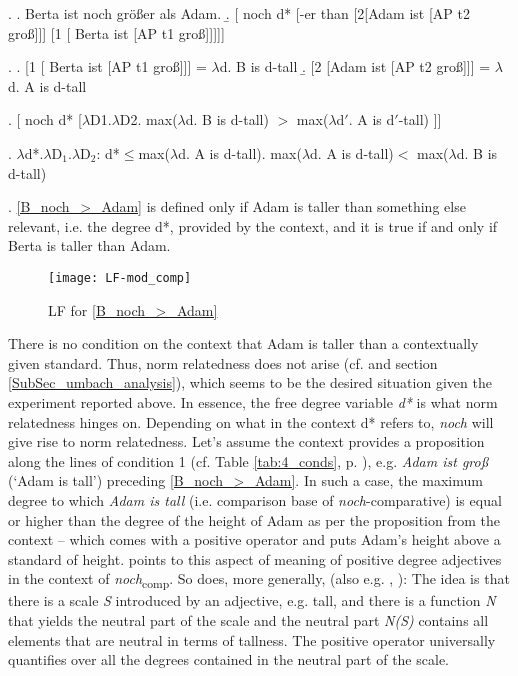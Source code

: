 \documentclass[output=paper,
modfonts
]{langscibook}
\begin{document}
\ex. \a. Berta ist noch größer als Adam. \label{B_noch_>_Adam}
\b. [ noch d* [-er than [2[Adam ist [AP t2 groß]]] [1 [ Berta ist [AP t1 groß]]]]] \label{LF_B_noch_>_Adam}

\ex. \label{PA_on_clauses} \a. [1 [ Berta ist [AP t1 groß]]] = $\lambda$d. B is d-tall
\b. [2 [Adam ist [AP t2 groß]]] =  $\lambda$d. A is d-tall

\ex. [ noch d* [$\lambda$D1.$\lambda$D2. max($\lambda$d. B is d-tall) $>$ max($\lambda$d$'$. A is d$'$-tall) ]] \label{calc_plugin}

\ex. $\lambda$d*.$\lambda$D$_1$.$\lambda$D$_2$: d*$\leq$max($\lambda$d. A is d-tall). max($\lambda$d. A is d-tall)$<$ max($\lambda$d. B is d-tall)  \label{output_calc}

\ex. \ref{B_noch_>_Adam} is defined only if Adam is taller than something else relevant, i.e. the degree d*, provided by the context, and it is true if and only if Berta is taller than Adam.

\begin{figure}[H]
\texttt{[image: LF-mod\_comp]}
\caption{LF for \ref{B_noch_>_Adam}}
\label{fig:LF_B_noch_>_Adam}
\end{figure}

\noindent There is no condition on the context that Adam is taller than a contextually given standard. Thus, norm relatedness does not arise (cf. \citealt{umbach2009a_comp} and section \ref{SubSec_umbach_analysis}), which seems to be the desired situation given the experiment reported above. In essence, the free degree variable \textit{d*} is what norm relatedness hinges on. Depending on what in the context d* refers to, \textit{noch} will give rise to norm relatedness. Let's assume the context provides a proposition along the lines of condition 1 (cf. Table \ref{tab:4_conds}, p. \pageref{tab:4_conds}), e.g. \textit{Adam ist groß} (`Adam is tall') preceding \ref{B_noch_>_Adam}. In such a case, the maximum degree to which \textit{Adam is tall} (i.e. comparison base of \textit{noch}-comparative) is equal or higher than the degree of the height of Adam as per the proposition from the context -- which comes with a positive operator and puts Adam's height above a standard of height. \citeauthor{umbach2009a_comp} \citeyearpar{umbach2009a_comp} points to this aspect of meaning of positive degree adjectives in the context of \textit{noch}\textsubscript{comp}. So does, more generally, \citeauthor{stechow2006} \citeyearpar{stechow2006}(also e.g. \citep{stechow1984}, \citep{Beck2011}): The idea is that there is a scale \textit{S} introduced by an adjective, e.g. tall, and there is a function \textit{N} that yields the neutral part of the scale and the neutral part \textit{N(S)} contains all elements that are neutral in terms of tallness. The positive operator universally quantifies over all the degrees contained in the neutral part of the scale. \citep{stechow2006}
\end{document}
